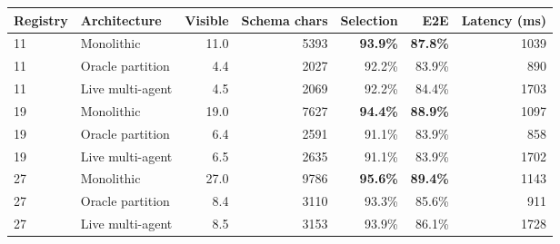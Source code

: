 \begin{tabular}{llrrrrr}
\toprule
Registry & Architecture & Visible & Schema chars & Selection & E2E & Latency (ms) \\
\midrule
11 & Monolithic & 11.0 & 5393 & \textbf{93.9\%} & \textbf{87.8\%} & 1039 \\
11 & Oracle partition & 4.4 & 2027 & 92.2\% & 83.9\% & 890 \\
11 & Live multi-agent & 4.5 & 2069 & 92.2\% & 84.4\% & 1703 \\
\midrule
19 & Monolithic & 19.0 & 7627 & \textbf{94.4\%} & \textbf{88.9\%} & 1097 \\
19 & Oracle partition & 6.4 & 2591 & 91.1\% & 83.9\% & 858 \\
19 & Live multi-agent & 6.5 & 2635 & 91.1\% & 83.9\% & 1702 \\
\midrule
27 & Monolithic & 27.0 & 9786 & \textbf{95.6\%} & \textbf{89.4\%} & 1143 \\
27 & Oracle partition & 8.4 & 3110 & 93.3\% & 85.6\% & 911 \\
27 & Live multi-agent & 8.5 & 3153 & 93.9\% & 86.1\% & 1728 \\
\bottomrule
\end{tabular}
